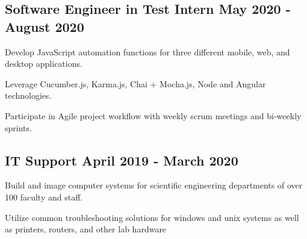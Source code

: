 \vspace*{12pt}
\subsection{{Software Engineer in Test Intern }\hfill May 2020 - August 2020}
\begin{zitemize}
    \item Develop JavaScript automation functions for three different mobile, web, and desktop applications.
    \item Leverage Cucumber.js, Karma.js, Chai + Mocha.js, Node and Angular technologies.
    \item Participate in Agile project workflow with weekly scrum meetings and bi-weekly sprints. 
\end{zitemize}

\vspace*{15pt}
\subsection{{IT Support }\hfill April 2019 - March 2020}
\begin{zitemize}
    \item Build and image computer systems for scientific engineering departments of over 100 faculty and staff.
    \item Utilize common troubleshooting solutions for windows and unix systems as well as printers, routers, and other lab hardware
\end{zitemize}


% 



